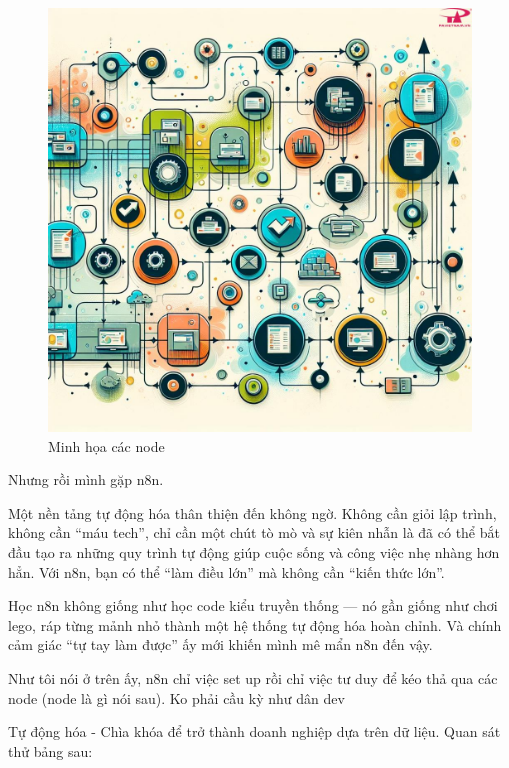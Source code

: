 \begin{figure}[htbp]
    \centering
    \includegraphics[width=1\linewidth]{images/wf.jpg}
    \caption{Minh họa các node}
\end{figure}

Nhưng rồi mình gặp n8n.

Một nền tảng tự động hóa thân thiện đến không ngờ. Không cần giỏi lập trình, không cần “máu tech”, chỉ cần một chút tò mò và sự kiên nhẫn là đã có thể bắt đầu tạo ra những quy trình tự động giúp cuộc sống và công việc nhẹ nhàng hơn hẳn. Với n8n, bạn có thể “làm điều lớn” mà không cần “kiến thức lớn”.

Học n8n không giống như học code kiểu truyền thống — nó gần giống như chơi lego, ráp từng mảnh nhỏ thành một hệ thống tự động hóa hoàn chỉnh. Và chính cảm giác “tự tay làm được” ấy mới khiến mình mê mẩn n8n đến vậy.

Như tôi nói ở trên ấy, n8n chỉ việc set up rồi chỉ việc tư duy để kéo thả qua các node (node là gì nói sau). Ko phải cầu kỳ như dân dev 

Tự động hóa - Chìa khóa để trở thành doanh nghiệp dựa trên dữ liệu. Quan sát thử bảng sau:

